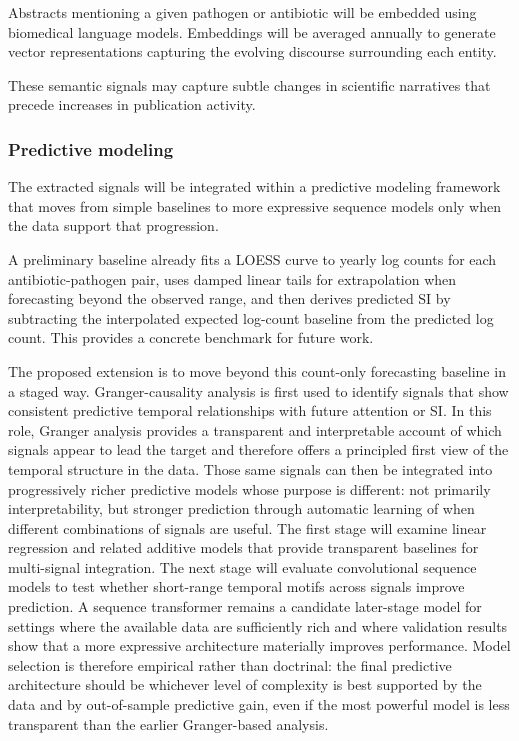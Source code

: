 \documentclass[
]{article}
\begin{document}
Abstracts mentioning a given pathogen or antibiotic will be embedded
using biomedical language models. Embeddings will be averaged annually
to generate vector representations capturing the evolving discourse
surrounding each entity.

These semantic signals may capture subtle changes in scientific
narratives that precede increases in publication activity.

\subsubsection{Predictive modeling}\label{45-predictive-modeling}

The extracted signals will be integrated within a predictive modeling
framework that moves from simple baselines to more expressive sequence
models only when the data support that progression.

A preliminary baseline already fits a LOESS curve to yearly log counts
for each antibiotic-pathogen pair, uses damped linear tails for
extrapolation when forecasting beyond the observed range, and then
derives predicted SI by subtracting the interpolated expected log-count
baseline from the predicted log count. This provides a concrete
benchmark for future work.

The proposed extension is to move beyond this count-only forecasting
baseline in a staged way. Granger-causality analysis is first used to
identify signals that show consistent predictive temporal relationships
with future attention or SI. In this role, Granger analysis provides a
transparent and interpretable account of which signals appear to lead
the target and therefore offers a principled first view of the temporal
structure in the data. Those same signals can then be integrated into
progressively richer predictive models whose purpose is different: not
primarily interpretability, but stronger prediction through automatic
learning of when different combinations of signals are useful. The
first stage will examine linear regression and related additive models
that provide transparent baselines for multi-signal integration. The
next stage will evaluate convolutional sequence models to test whether
short-range temporal motifs across signals improve prediction. A
sequence transformer remains a candidate later-stage model for settings
where the available data are sufficiently rich and where validation
results show that a more expressive architecture materially improves
performance. Model selection is therefore empirical rather than
doctrinal: the final predictive architecture should be whichever level
of complexity is best supported by the data and by out-of-sample
predictive gain, even if the most powerful model is less transparent
than the earlier Granger-based analysis.
\end{document}
